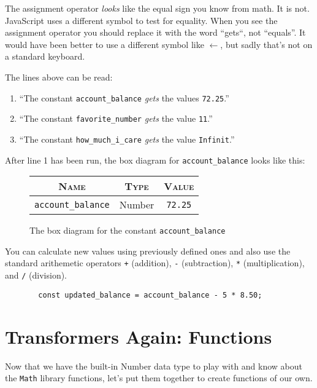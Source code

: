 \documentclass{amsart}
\begin{document}
The assignment operator \textit{looks} like the equal sign you know from math. It is not. JavaScript uses a different symbol to test for equality. When you see the assignment operator you should replace it with the word ``gets``, not ``equals''. It would have been better to use a different symbol like $\leftarrow$, but sadly that's not on a standard keyboard.

The lines above can be read:
\begin{enumerate}
  \item ``The constant \texttt{account\_balance} \emph{gets} the values \texttt{72.25}.''
  \item ``The constant \texttt{favorite\_number} \emph{gets} the value \texttt{11}.''
  \item ``The constant \texttt{how\_much\_i\_care} \emph{gets} the value \texttt{Infinit}.''
\end{enumerate}

After line 1 has been run, the box diagram for \texttt{account\_balance} looks like this:

\begin{figure}[h]
  \color{cyan}
\begin{tabular}{|c|c|c|}
  \hline
  \textsc{Name} & \textsc{Type} & \textsc{Value}\\
  \hline
  \texttt{account\_balance} & \textsf{Number} & \texttt{72.25}\\
  \hline
\end{tabular}
\caption{The box diagram for the constant \texttt{account\_balance}}
\end{figure}

You can calculate new values using previously defined ones and also use the standard arithemetic operators {\color{cyan}\texttt{+}} (addition), {\color{cyan}\texttt{-}} (subtraction), {\color{cyan}\texttt{*}} (multiplication), and {\color{cyan}\texttt{/}} (division).

\begin{figure}[h]
  \begin{lstlisting}
  const updated_balance = account_balance - 5 * 8.50;
  \end{lstlisting}
\end{figure}

\section{Transformers Again: Functions}

Now that we have the built-in \textsf{Number} data type to play with and know about the \texttt{Math} library functions, let's put them together to create functions of our own.
\end{document}
